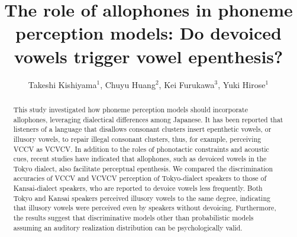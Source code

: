 \documentclass[a4paper,11pt,twocolumn]{article}
\title{The role of allophones in phoneme perception models: Do devoiced vowels trigger vowel epenthesis?}
\author{
    Takeshi Kishiyama$^1$,
    Chuyu Huang$^2$,
    Kei Furukawa$^3$,
    Yuki Hirose$^1$}
\begin{document}
\maketitle

\begin{abstract}
This study investigated how phoneme perception models should incorporate allophones, leveraging dialectical differences among Japanese. It has been reported that listeners of a language that disallows consonant clusters insert epenthetic vowels, or illusory vowels, to repair illegal consonant clusters, thus, for example, perceiving VCCV as VCVCV. In addition to the roles of phonotactic constraints and acoustic cues, recent studies have indicated that allophones, such as devoiced vowels in the Tokyo dialect, also facilitate perceptual epenthesis. We compared the discrimination accuracies of VCCV and VCVCV perception of Tokyo-dialect speakers to those of Kansai-dialect speakers, who are reported to devoice vowels less frequently. Both Tokyo and Kansai speakers perceived illusory vowels to the same degree, indicating that illusory vowels were perceived even by speakers without devoicing. Furthermore, the results suggest that discriminative models other than probabilistic models assuming an auditory realization distribution can be psychologically valid.
\end{abstract}







\end{document}
